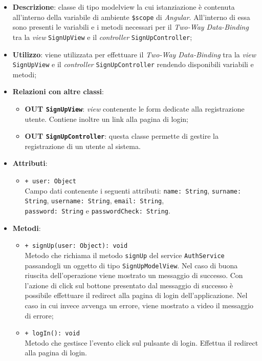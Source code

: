 	\begin{itemize}
		\item \textbf{Descrizione}: classe di tipo modelview la cui istanziazione è contenuta all'interno della variabile di ambiente \texttt{\$scope} di \textit{Angular}. All'interno di essa sono presenti le variabili e i metodi necessari per il \textit{Two-Way Data-Binding} tra la \textit{view} \texttt{SignUpView} e il \textit{controller} \texttt{SignUpController};
		\item \textbf{Utilizzo}: viene utilizzata per effettuare il \textit{Two-Way Data-Binding} tra la \textit{view} \texttt{SignUpView} e il \textit{controller} \texttt{SignUpController} rendendo disponibili variabili e metodi;
		\item \textbf{Relazioni con altre classi}: 
		\begin{itemize}
			\item \textbf{OUT \texttt{SignUpView}}: \textit{view} contenente le form dedicate alla registrazione utente. Contiene inoltre un link alla pagina di login; 
			\item \textbf{OUT \texttt{SignUpController}}: questa classe permette di gestire la registrazione di un utente al sistema.
		\end{itemize}
		\item \textbf{Attributi}: 
		\begin{itemize}
			\item \texttt{+ user: Object} \\ Campo dati contenente i seguenti attributi: \texttt{name: String}, \texttt{surname: String}, \texttt{username: String}, \texttt{email: String},\\ \texttt{password: String} e \texttt{passwordCheck: String}.
		\end{itemize}
		\item \textbf{Metodi}: 
		\begin{itemize}
			\item \texttt{+ signUp(user: Object): void} \\
			Metodo che richiama il metodo \texttt{signUp} del service \texttt{AuthService} passandogli un oggetto di tipo \texttt{SignUpModelView}. Nel caso di buona riuscita dell'operazione viene mostrato un messaggio di successo. Con l'azione di click sul bottone presentato dal messaggio di successo è possibile effettuare il redirect alla pagina di login dell'applicazione. Nel caso in cui invece avvenga un errore, viene mostrato a video il messaggio di errore;
			\item \texttt{+ logIn(): void} \\
			Metodo che gestisce l’evento click sul pulsante di login. Effettua il redirect alla pagina di login.
		\end{itemize}
	\end{itemize}
	
	